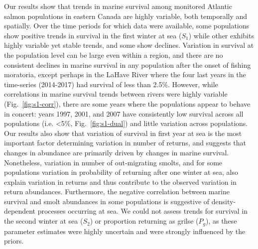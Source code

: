 \documentclass[12pt]{article}
\newcommand{\So}{$S_{1}$\xspace}
\newcommand{\St}{$S_{2}$\xspace}
\newcommand{\Pg}{$P_g$\xspace}
\begin{document}

Our results show that trends in marine survival among monitored Atlantic salmon
populations in eastern Canada are highly variable, both temporally and
spatially. Over the time periods for which data were available, some
populations show positive trends in survival in the first winter at sea (\So)
while other exhibits highly variable yet stable trends, and some show declines.
Variation in survival at the population level can be large even within
a region, and there are no consistent declines in marine survival in any
population after the onset of fishing moratoria, except perhaps in the LaHave
River where the four last years in the time-series (2014-2017) had survival of
less than 2.5\%.
However, while correlations in marine survival trends between rivers were highly 
variable (Fig.~\ref{fig:s1-corr}),
there are some years where the populations appear to behave in concert:
years 1997, 2001, and 2007 have consistently low survival across all populations 
(i.e. <5\%, Fig.~\ref{fig:s1-dual}) and little variation across populations.
Our results also show that variation of survival in first year at sea is the most
important factor determining variation in number of returns, and suggests that 
changes in abundance are primarily driven by changes in marine survival. 
Nonetheless, variation in number of out-migrating smolts, and for some populations
variation in probability of returning after one winter at sea, also explain
variation in returns and thus contribute to the observed variation in return abundances.
Furthermore, the negative correlation between marine survival and smolt
abundances in some populations is suggestive of density-dependent processes
occurring at sea.
We could not assess trends for survival in the second winter at sea (\St) or
proportion returning as grilse (\Pg), as these parameter estimates were highly
uncertain and were strongly influenced by the priors. 

\end{document}
